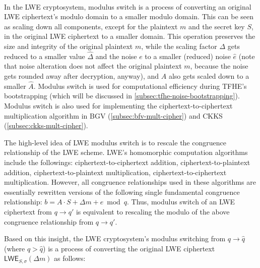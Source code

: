 $ $


In the LWE cryptosystem, modulus switch is a process of converting an original LWE ciphertext's modulo domain to a smaller modulo domain. This can be seen as scaling down all components, except for the plaintext $m$ and the secret key $S$, in the original LWE ciphertext to a smaller domain. This operation preserves the size and integrity of the original plaintext $m$, while the scaling factor $\Delta$ gets reduced to a smaller value $\hat{\Delta}$ and the noise $e$ to a smaller (reduced) noise $\hat{e}$ (note that noise alteration does not affect the original plaintext $m$, because the noise gets rounded away after decryption, anyway), and $A$ also gets scaled down to a smaller $\hat A$. Modulus switch is used for computational efficiency during TFHE's bootstrapping (which will be discussed in \autoref{subsec:tfhe-noise-bootstrapping}). Modulus switch is also used for implementing the ciphertext-to-ciphertext multiplication algorithm in BGV (\autoref{subsec:bfv-mult-cipher}) and CKKS (\autoref{subsec:ckks-mult-cipher}). 

The high-level idea of LWE modulus switch is to rescale the congruence relationship of the LWE scheme. LWE's homomorphic computation algorithms include the followings: ciphertext-to-ciphertext addition, ciphertext-to-plaintext addition, ciphertext-to-plaintext multiplication, ciphertext-to-ciphertext multiplication. However, all congruence relationships used in these algorithms are essentially rewritten versions of the following single fundamental congruence relationship: $b = A\cdot S + \Delta m + e \bmod q$. Thus, modulus switch of an LWE ciphertext from $q \rightarrow q'$ is equivalent to rescaling the modulo of the above congruence relationship from $q \rightarrow q'$.

Based on this insight, the LWE cryptosystem's modulus switching from $q \rightarrow \hat{q}$ (where $q > \hat{q}$) is a process of converting the original LWE ciphertext $\textsf{LWE}_{S, \sigma}(\Delta m)$ as follows:

